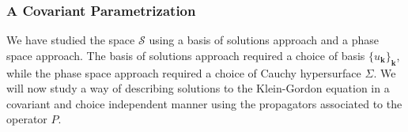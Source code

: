 \documentclass[letterpaper,12pt,titlepage,oneside,final]{book}
\newcommand{\mf}{\mathsf}%
\DeclareMathOperator*{\sumint}{%
\mathchoice%
  {\ooalign{$\displaystyle\sum$\cr\hidewidth$\displaystyle\int$\hidewidth\cr}}
  {\ooalign{\raisebox{.14\height}{\scalebox{.7}{$\textstyle\sum$}}\cr\hidewidth$\textstyle\int$\hidewidth\cr}}
  {\ooalign{\raisebox{.2\height}{\scalebox{.6}{$\scriptstyle\sum$}}\cr$\scriptstyle\int$\cr}}
  {\ooalign{\raisebox{.2\height}{\scalebox{.6}{$\scriptstyle\sum$}}\cr$\scriptstyle\int$\cr}}
}
\begin{document}




\subsubsection*{A Covariant Parametrization}

We have studied the space $\mathcal{S}$ using a basis of solutions approach and a phase space approach. The basis of solutions approach required a choice of basis $\{u_{\bm k}\}_{\bm k}$, while the phase space approach required a choice of Cauchy hypersurface $\Sigma$. We will now study a way of describing solutions to the Klein-Gordon equation in a covariant and choice independent manner using the propagators associated to the operator $P$.
\end{document}
